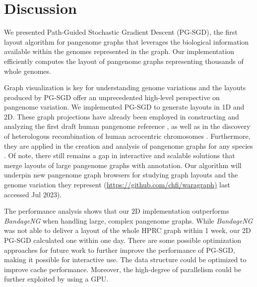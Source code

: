 \documentclass{bioinfo}
\theoremstyle{definition}
\newcommand{\red}[1]{{\textcolor{Red}{#1}}}
\newcommand{\FIXME}[1]{\red{[FIXME: #1]}}
\begin{document}
	\section{Discussion}
	\label{sec:discussion}
	
	We presented Path-Guided Stochastic Gradient Descent (PG-SGD), the first layout algorithm for pangenome graphs that leverages the biological information available within the genomes represented in the graph.
	Our implementation efficiently computes the layout of pangenome graphs representing thousands of whole genomes.
	
	Graph visualization is key for understanding genome variations and the layouts produced by PG-SGD offer an unprecedented high-level perspective on pangenome variation.
	We implemented PG-SGD to generate layouts in 1D and 2D.
	These graph projections have already been employed in constructing and analyzing the first draft human pangenome reference \citep{Liao2023}, as well as in the discovery of heterologous recombination of human acrocentric chromosomes \citep{Guarracino2023}.
	Furthermore, they are applied in the creation and analysis of pangenome graphs for any species \citep{Guarracino2022, Garrison2023}.
	Of note, there still remains a gap in interactive and scalable solutions that merge layouts of large pangenome graphs with annotation.
	Our algorithm will underpin new pangenome graph browsers for studying graph layouts and the genome variation they represent (\url{https://github.com/chfi/waragraph)} last accessed Jul 2023).
	
	The performance analysis shows that our 2D implementation outperforms \textit{BandageNG} when handling large, complex pangenome graphs.
	While \textit{BandageNG} was not able to deliver a layout of the whole HPRC graph within 1 week, our 2D PG-SGD calculated one within one day.
	There are some possible optimization approaches for future work to further improve the performance of PG-SGD, making it possible for interactive use. 
	The data structure could be optimized to improve cache performance. Moreover, the high-degree of parallelism could be further exploited by using a GPU.  
\end{document}
